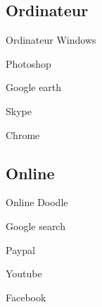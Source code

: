 \documentclass{beamer}
\begin{document}
\subsection{Ordinateur}
\begin{frame}{Ordinateur}
\noindent\vspace{0.1in}\hspace{1.2in} Windows \par
\noindent\vspace{0.1in}\hspace{2.7in} Photoshop \par
\noindent\vspace{0.1in}\hspace{1.7in} Google earth \par
\noindent\vspace{0.1in}\hspace{0.4in} Skype \par
\noindent\vspace{0.1in}\hspace{2.8in} Chrome \par
\end{frame}

\subsection{Online}
\begin{frame}{Online}
\noindent\vspace{0.1in}\hspace{2.2in} Doodle \par
\noindent\vspace{0.1in}\hspace{0.4in} Google search \par
\noindent\vspace{0.1in}\hspace{1.9in} Paypal \par
\noindent\vspace{0.1in}\hspace{3.1in} Youtube \par 		%
\noindent\vspace{0.1in}\hspace{0.5in} Facebook \par
\end{frame}
\end{document}
